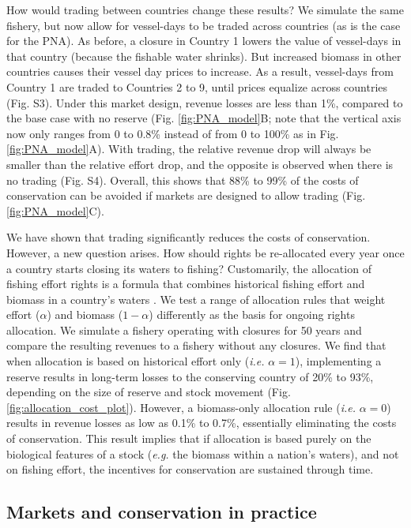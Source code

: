 \documentclass[12pt]{article}
\begin{document}
How would trading between countries change these results? We simulate the same fishery, but now allow for vessel-days to be traded across countries (as is the case for the PNA). As before, a closure in Country 1 lowers the value of vessel-days in that country (because the fishable water shrinks). But increased biomass in other countries causes their vessel day prices to increase. As a result, vessel-days from Country 1 are traded to Countries 2 to 9, until prices equalize across countries (Fig. S3). Under this market design, revenue losses are less than 1\%, compared to the base case with no reserve (Fig. \ref{fig:PNA_model}B; note that the vertical axis now only ranges from 0 to 0.8\% instead of from 0 to 100\% as in Fig. \ref{fig:PNA_model}A). With trading, the relative revenue drop will always be smaller than the relative effort drop, and the opposite is observed when there is no trading (Fig. S4). Overall, this shows that 88\% to 99\% of the costs of conservation can be avoided if markets are designed to allow trading (Fig. \ref{fig:PNA_model}C).

We have shown that trading significantly reduces the costs of conservation. However, a new question arises. How should rights be re-allocated every year once a country starts closing its waters to fishing? Customarily, the allocation of fishing effort rights is a formula that combines historical fishing effort and biomass in a country's waters \cite{havice_2013}. We test a range of allocation rules that weight effort ($\alpha$) and biomass ($1 - \alpha$) differently as the basis for ongoing rights allocation. We simulate a fishery operating with closures for 50 years and compare the resulting revenues to a fishery without any closures. We find that when allocation is based on historical effort only (\emph{i.e.} $\alpha = 1$), implementing a reserve results in long-term losses to the conserving country of 20\% to 93\%, depending on the size of reserve and stock movement (Fig. \ref{fig:allocation_cost_plot}). However, a biomass-only allocation rule (\emph{i.e.} $\alpha = 0$) results in revenue losses as low as 0.1\% to 0.7\%, essentially eliminating the costs of conservation. This result implies that if allocation is based purely on the biological features of a stock (\emph{e.g.} the biomass within a nation's waters), and not on fishing effort, the incentives for conservation are sustained through time.

\subsection{Markets and conservation in practice}
\end{document}
